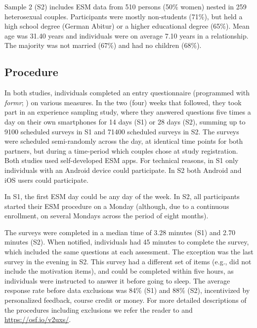 \documentclass[jou,a4paper,draftfirst]{apa6}\usepackage[]{graphicx}\usepackage[]{color}
\begin{document}
Sample 2 (S2) includes ESM data from 510 persons (50\% women) nested in 259 heterosexual couples. Participants were mostly non-students (71\%), but held a high school degree (German Abitur) or a higher educational degree (65\%). Mean age was 31.40 years and individuals were on average 7.10 years in a relationship. The majority was not married (67\%) and had no children (68\%).

\subsection{Procedure}
In both studies, individuals completed an entry questionnaire (programmed with \emph{formr}; ) on various measures. In the two (four) weeks that followed, they took part in an experience sampling study, where they answered questions five times a day on their own smartphones for 14 days (S1) or 28 days (S2), summing up to 9100 scheduled surveys in S1 and 71400 scheduled surveys in S2. The surveys were scheduled semi-randomly across the day, at identical time points for both partners, but during a time-period which couples chose at study registration. Both studies used self-developed ESM apps. For technical reasons, in S1 only individuals with an Android device could participate. In S2 both Android and iOS users could participate.

In S1, the first ESM day could be any day of the week. In S2, all participants started their ESM procedure on a Monday (although, due to a continuous enrollment, on several Mondays across the period of eight months).

The surveys were completed in a median time of 3.28 minutes (S1) and 2.70 minutes (S2). When notified, individuals had 45 minutes to complete the survey, which included the same questions at each assessment. The exception was the last survey in the evening in S2. This survey had a different set of items (e.g., did not include the motivation items), and could be completed within five hours, as individuals were instructed to answer it before going to sleep. The average response rate before data exclusions was 84\% (S1) and 88\% (S2), incentivized by personalized feedback, course credit or money. For more detailed descriptions of the procedures including exclusions we refer the reader to \textcite{zygar_MotiveDispositionsStates_2018} and \url{https://osf.io/v2uxs/}.

\end{document}
